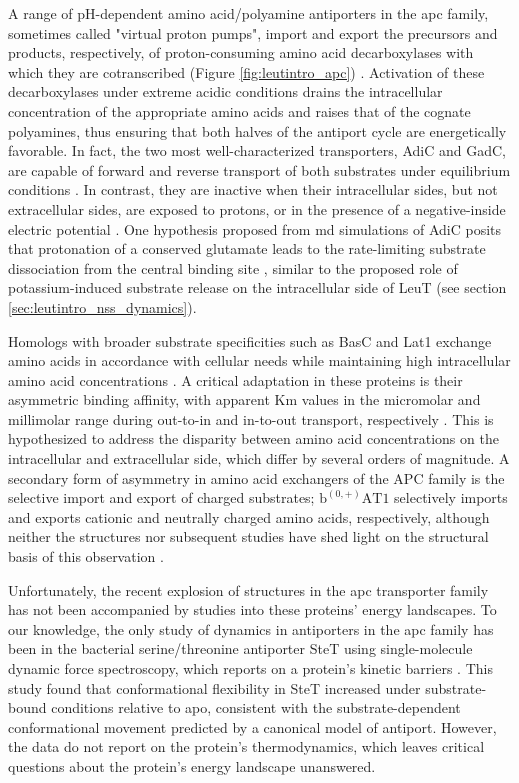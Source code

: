 A range of pH-dependent amino acid/polyamine antiporters in the \gls{apc} family, sometimes called "virtual proton pumps", import and export the precursors and products, respectively, of proton-consuming amino acid decarboxylases with which they are cotranscribed (Figure \ref{fig:leutintro_apc}) \citep*{Fang2009, Foster2004, Kanjee2013, Krammer2019, Ma2012}. Activation of these decarboxylases under extreme acidic conditions drains the intracellular concentration of the appropriate amino acids and raises that of the cognate polyamines, thus ensuring that both halves of the antiport cycle are energetically favorable. In fact, the two most well-characterized transporters, AdiC and GadC, are capable of forward and reverse transport of both substrates under equilibrium conditions \citep*{Ma2012, Ma2013, Tsai2013, Tsai2013a}. In contrast, they are inactive when their intracellular sides, but not extracellular sides, are exposed to protons, or in the presence of a negative-inside electric potential \citep*{Tsai2013, Tsai2013a}. One hypothesis proposed from \gls{md} simulations of AdiC posits that protonation of a conserved glutamate leads to the rate-limiting substrate dissociation from the central binding site \citep*{Zomot2011}, similar to the proposed role of potassium-induced substrate release on the intracellular side of LeuT (see section \ref{sec:leutintro_nss_dynamics}).

Homologs with broader substrate specificities such as BasC and Lat1 exchange amino acids in accordance with cellular needs while maintaining high intracellular amino acid concentrations \citep*{Errasti-Murugarren2019, Lee2019, Yan2019}. A critical adaptation in these proteins is their asymmetric binding affinity, with apparent Km values in the micromolar and millimolar range during out-to-in and in-to-out transport, respectively \citep*{Bartoccioni2019}. This is hypothesized to address the disparity between amino acid concentrations on the intracellular and extracellular side, which differ by several orders of magnitude. A secondary form of asymmetry in amino acid exchangers of the APC family is the selective import and export of charged substrates; $\mathrm{b^{(0,+)}AT1}$ selectively imports and exports cationic and neutrally charged amino acids, respectively, although neither the structures nor subsequent studies have shed light on the structural basis of this observation \citep*{Wu2020, Yan2020a}.

Unfortunately, the recent explosion of structures in the \gls{apc} transporter family has not been accompanied by studies into these proteins' energy landscapes. To our knowledge, the only study of dynamics in antiporters in the \gls{apc} family has been in the bacterial serine/threonine antiporter SteT \citep*{Reig2007} using single-molecule dynamic force spectroscopy, which reports on a protein's kinetic barriers \citep*{Bippes2009}. This study found that conformational flexibility in SteT increased under substrate-bound conditions relative to apo, consistent with the substrate-dependent conformational movement predicted by a canonical model of antiport. However, the data do not report on the protein's thermodynamics, which leaves critical questions about the protein's energy landscape unanswered.


